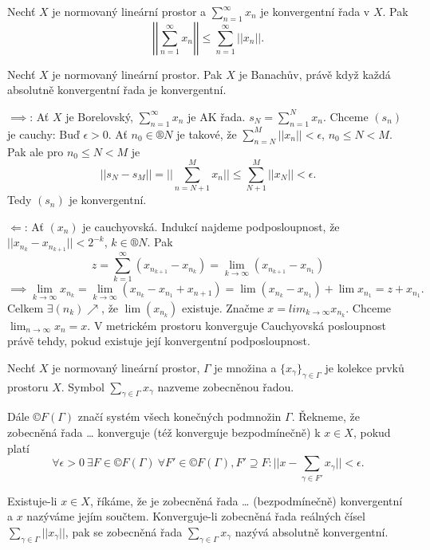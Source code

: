 \documentclass[12pt]{article}					%
\begin{document}
\begin{poznamka}[Fakt]
	Nechť $X$ je normovaný lineární prostor a $\sum_{n = 1}^∞ x_n$ je konvergentní řada v $X$. Pak
	$$ \left|\left| \sum_{n=1}^∞ x_n \right|\right| ≤ \sum_{n=1}^∞ ||x_n||. $$
\end{poznamka}

\begin{veta}
	Nechť $X$ je normovaný lineární prostor. Pak $X$ je Banachův, právě když každá absolutně konvergentní řada je konvergentní.

	\begin{dukazin}
		$\implies$: Ať $X$ je Borelovský, $\sum_{n=1}^∞ x_n$ je AK řada. $s_N = \sum_{n=1}^N x_n$. Chceme $(s_n)$ je cauchy: Buď $\epsilon > 0$. Ať $n_0 \in ®N$ je takové, že $\sum_{n=N}^M ||x_n|| < \epsilon$, $n_0 ≤ N < M$. Pak ale pro $n_0 ≤ N < M$ je
		$$ ||s_N - s_M|| = ||\sum_{n=N+1}^M x_n|| ≤ \sum_{N+1}^M||x_N|| < \epsilon. $$
		Tedy $(s_n)$ je konvergentní.

		$\Leftarrow$: Ať $(x_n)$ je cauchyovská. Indukcí najdeme podposloupnost, že $||x_{n_k} - x_{n_{k+1}}|| < 2^{-k}$, $k \in ®N$. Pak
		$$ z = \sum_{k=1}^∞(x_{n_{k+1}} - x_{n_k}) = \lim_{k \rightarrow ∞}(x_{n_{k+1}} - x_{n_1}) $$
		$$ \implies \lim_{k \rightarrow ∞} x_{n_k} = \lim_{k \rightarrow ∞} (x_{n_k} - x_{n_1} + x_{n+1}) = \lim(x_{n_k} - x_{n_1}) + \lim x_{n_1} = z + x_{n_1}. $$
		Celkem $\exists (n_k) \nearrow$, že $\lim(x_{n_k})$ existuje. Značme $x = lim_{k \rightarrow ∞} x_{n_k}$.
		Chceme $\lim_{n \rightarrow ∞} x_n = x$. V metrickém prostoru konverguje Cauchyovská posloupnost právě tehdy, pokud existuje její konvergentní podposloupnost.
	\end{dukazin}
\end{veta}

\begin{definice}
	Nechť $X$ je normovaný lineární prostor, $\Gamma$ je množina a $\{x_\gamma\}_{\gamma \in \Gamma}$ je kolekce prvků prostoru $X$. Symbol $\sum_{\gamma \in \Gamma} x_\gamma$ nazveme zobecněnou řadou.

	Dále $©F(\Gamma)$ značí systém všech konečných podmnožin $\Gamma$. Řekneme, že zobecněná řada … konverguje (též konverguje bezpodmínečně) k $x \in X$, pokud platí
	$$ \forall \epsilon > 0\ \exists F \in ©F(\Gamma)\ \forall F' \in ©F(\Gamma), F' \supseteq F: ||x - \sum_{\gamma \in F'} x_\gamma|| < \epsilon. $$

	Existuje-li $x \in X$, říkáme, že je zobecněná řada … (bezpodmínečně) konvergentní a $x$ nazýváme jejím součtem. Konverguje-li zobecněná řada reálných čísel $\sum_{\gamma \in \Gamma} ||x_\gamma||$, pak se zobecněná řada $\sum_{\gamma \in \Gamma} x_\gamma$ nazývá absolutně konvergentní.
\end{definice}
\end{document}
